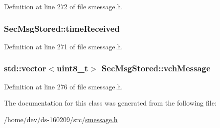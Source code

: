 Definition at line 272 of file smessage.\+h.

\hypertarget{class_sec_msg_stored_a9c3a85bc56cd832e5cdf3f04aa37eb3c}{}
\subsubsection[{time\+Received}]{ Sec\+Msg\+Stored\+::time\+Received}\label{class_sec_msg_stored_a9c3a85bc56cd832e5cdf3f04aa37eb3c}


Definition at line 271 of file smessage.\+h.

\hypertarget{class_sec_msg_stored_a109dca8a348a188efba86d41e21cdfed}{}
\subsubsection[{vch\+Message}]{\setlength{\rightskip}{0pt plus 5cm}std\+::vector$<${\bf uint8\+\_\+t}$>$ Sec\+Msg\+Stored\+::vch\+Message}\label{class_sec_msg_stored_a109dca8a348a188efba86d41e21cdfed}


Definition at line 276 of file smessage.\+h.



The documentation for this class was generated from the following file\+:\begin{DoxyCompactItemize}
\item 
/home/dev/ds-\/160209/src/\hyperlink{smessage_8h}{smessage.\+h}\end{DoxyCompactItemize}
